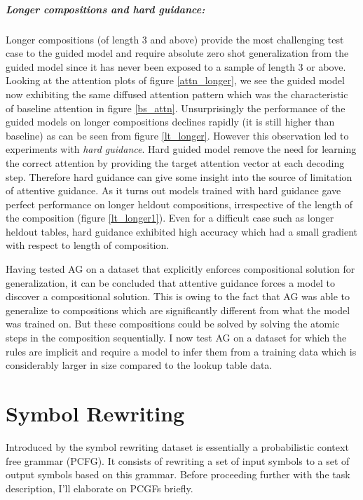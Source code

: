 \subparagraph{Longer compositions and hard guidance:} Longer compositions (of length 3 and above) provide the most challenging test case to the guided model and require absolute zero shot generalization from the guided model since it has never been exposed to a sample of length 3 or above. Looking at the attention plots of figure \ref{attn_longer}, we see the guided model now exhibiting the same diffused attention pattern which was the characteristic of baseline attention in figure \ref{bs_attn}. Unsurprisingly the performance of the guided models on longer compositions declines rapidly (it is still higher than baseline) as can be seen from figure \ref{lt_longer}.
However this observation led to experiments with \textit{hard guidance}. Hard guided model remove the need for learning the correct attention by providing the target attention vector at each decoding step. Therefore hard guidance can give some insight into the source of limitation of attentive guidance. As it turns out models trained with hard guidance gave perfect performance on longer heldout compositions, irrespective of the length of the composition (figure \ref{lt_longer1}). Even for a difficult case such as longer heldout tables, hard guidance exhibited high accuracy which had a small gradient with respect to length of composition.

Having tested AG on a dataset that explicitly enforces compositional solution for generalization, it can be concluded that attentive guidance forces a model to discover a compositional solution. This is owing to the fact that AG was able to generalize to compositions which are significantly different from what the model was trained on. But these compositions could be solved by solving the atomic steps in the composition sequentially. I now test AG on a dataset for which the rules are implicit and require a model to infer them from a training data which is considerably larger in size compared to the lookup table data. 



\section{Symbol Rewriting} \label{datasets:sr}
Introduced by \cite{Weber2018} the symbol rewriting dataset is essentially a probabilistic context free grammar (PCFG). It consists of rewriting a set of input symbols to a set of output symbols based on this grammar. Before proceeding further with the task description, I'll elaborate on PCGFs briefly.

